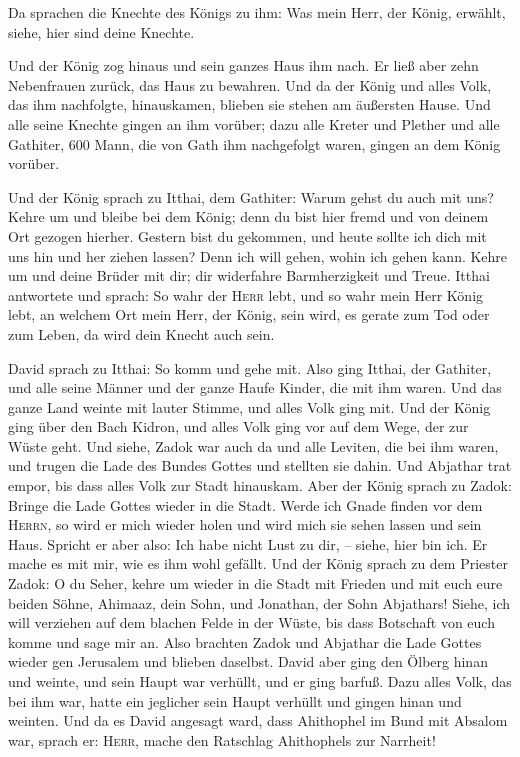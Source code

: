  Da sprachen die Knechte des Königs zu ihm: Was mein
Herr, der König, erwählt, siehe, hier sind deine Knechte.

 Und der König zog hinaus und sein ganzes Haus ihm nach.
Er ließ aber zehn Nebenfrauen zurück, das Haus zu bewahren.
 Und da der König und alles Volk, das ihm nachfolgte,
hinauskamen, blieben sie stehen am äußersten Hause.  Und
alle seine Knechte gingen an ihm vorüber; dazu alle Kreter und Plether
und alle Gathiter, 600 Mann, die von Gath ihm nachgefolgt waren, gingen
an dem König vorüber.

 Und der König sprach zu Itthai, dem Gathiter: Warum
gehst du auch mit uns? Kehre um und bleibe bei dem König; denn du bist
hier fremd und von deinem Ort gezogen hierher.  Gestern
bist du gekommen, und heute sollte ich dich mit uns hin und her ziehen
lassen? Denn ich will gehen, wohin ich gehen kann. Kehre um und deine
Brüder mit dir; dir widerfahre Barmherzigkeit und Treue. 
Itthai antwortete und sprach: So wahr der \textsc{Herr} lebt, und so
wahr mein Herr König lebt, an welchem Ort mein Herr, der König, sein
wird, es gerate zum Tod oder zum Leben, da wird dein Knecht auch sein.

 David sprach zu Itthai: So komm und gehe mit. Also ging
Itthai, der Gathiter, und alle seine Männer und der ganze Haufe Kinder,
die mit ihm waren.  Und das ganze Land weinte mit lauter
Stimme, und alles Volk ging mit. Und der König ging über den Bach
Kidron, und alles Volk ging vor auf dem Wege, der zur Wüste geht.
 Und siehe, Zadok war auch da und alle Leviten, die bei
ihm waren, und trugen die Lade des Bundes Gottes und stellten sie dahin.
Und Abjathar trat empor, bis dass alles Volk zur Stadt hinauskam.
 Aber der König sprach zu Zadok: Bringe die Lade Gottes
wieder in die Stadt. Werde ich Gnade finden vor dem \textsc{Herrn}, so
wird er mich wieder holen und wird mich sie sehen lassen und sein Haus.
 Spricht er aber also: Ich habe nicht Lust zu dir, --
siehe, hier bin ich. Er mache es mit mir, wie es ihm wohl gefällt.
 Und der König sprach zu dem Priester Zadok: O du Seher,
kehre um wieder in die Stadt mit Frieden und mit euch eure beiden Söhne,
Ahimaaz, dein Sohn, und Jonathan, der Sohn Abjathars! 
Siehe, ich will verziehen auf dem blachen Felde in der Wüste, bis dass
Botschaft von euch komme und sage mir an.  Also brachten
Zadok und Abjathar die Lade Gottes wieder gen Jerusalem und blieben
daselbst.  David aber ging den Ölberg hinan und weinte,
und sein Haupt war verhüllt, und er ging barfuß. Dazu alles Volk, das
bei ihm war, hatte ein jeglicher sein Haupt verhüllt und gingen hinan
und weinten.  Und da es David angesagt ward, dass
Ahithophel im Bund mit Absalom war, sprach er: \textsc{Herr}, mache den
Ratschlag Ahithophels zur Narrheit!

